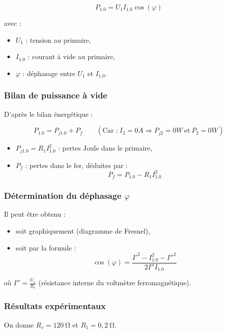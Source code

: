 \documentclass[french, 12pt]{article}
\begin{document}
$$ P_{1.0} = U_1 I_{1.0} \cos(\varphi) $$

avec :

\begin{itemize}
	\item $U_1$ : tension au primaire,
	\item $I_{1.0}$ : courant à vide au primaire,
	\item $\varphi$ : déphasage entre $U_1$ et $I_{1.0}$.
\end{itemize}

\subsubsection{Bilan de puissance à vide}

D'après le bilan énergétique :

$$ P_{1.0} = P_{j1.0} + P_f \qquad \left( \text{Car :}\ I_2 = 0 \si{A} \Longrightarrow P_{j2} = 0 \si{W}\ \text{et}\ P_2 = 0 \si{W} \right) $$

\begin{itemize}
	\item $P_{j1.0} = R_1 I_{1.0}^2$ : pertes Joule dans le primaire,
	\item $P_f$ : pertes dans le fer, déduites par :
		$$ P_f = P_{1.0} - R_1 I_{1.0}^2 $$
\end{itemize}

\subsubsection{Détermination du déphasage $\varphi$}

Il peut être obtenu :

\begin{itemize}
	\item soit graphiquement (diagramme de Fresnel),
	\item soit par la formule :
		$$ \cos(\varphi) = \frac{I'^2 - I_{1.0}^2 - I''^2}{2 I'' I_{1.0}} $$
\end{itemize}

où $I'' = \frac{U_1}{R_v}$ (résistance interne du voltmètre ferromagnétique).

\subsubsection{Résultats expérimentaux}

On donne $R_v = 120\ \si{\ohm}$ et $R_1 = 0,2\ \si{\ohm}$.
\end{document}
